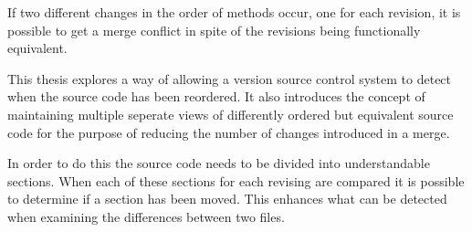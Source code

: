 If two different changes in the order of methods occur, one for each revision, it is possible to get a merge conflict in spite of the revisions being functionally equivalent.

This thesis explores a way of allowing a version source control system to detect when the source code has been reordered.  It also introduces the concept of maintaining multiple seperate views of differently ordered but equivalent source code for the purpose of reducing the number of changes introduced in a merge. 
 
In order to do this the source code needs to be divided into understandable sections. When each of these sections for each revising are compared it is possible to determine if a section has been moved.  This enhances what can be detected when examining the differences between two files.



